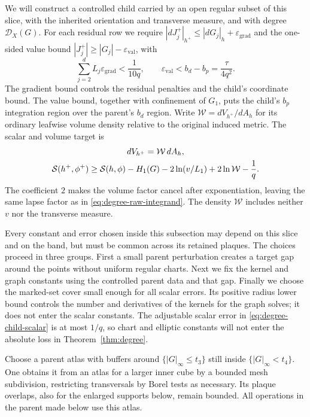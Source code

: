 We will construct a controlled child carried by an open regular subset
of this slice, with the inherited orientation and transverse measure,
and with degree $\mathcal D_X(G)$.  For each residual row we require
$|dJ_j^+|_{h^+}\le |dG_j|_h+\varepsilon_{\mathrm{grad}}$ and the
one-sided value bound
$|J_j^+|\ge |G_j|-\varepsilon_{\mathrm{val}}$, with
\begin{equation}\label{eq:degree-tolerances}
 \sum_{j=2}^d L_j\varepsilon_{\mathrm{grad}}<\frac1{10q},
 \qquad \varepsilon_{\mathrm{val}}<b_d-b_p=\frac{\tau}{4q^2}.
\end{equation}
The gradient bound controls the residual penalties and the child's
coordinate bound.
The value bound, together with confinement of $G_1$, puts the child's
$b_p$ integration region over the parent's $b_d$ region.  Write
$\mathcal W=dV_{h^+}/dA_h$ for its ordinary leafwise volume density
relative to the original induced metric.  The scalar and volume target is
\begin{equation}\label{eq:degree-child-scalar}
 \begin{gathered}
 dV_{h^+}=\mathcal W\,dA_h,\\
 \mathcal S(h^+,\phi^+)\ge\mathcal S(h,\phi)-H_1(G)-2\ln(v/L_1)
                                      +2\ln\mathcal W-\frac1q.
 \end{gathered}
\end{equation}
The coefficient $2$ makes the volume factor cancel after exponentiation,
leaving the same lapse factor as in \eqref{eq:degree-raw-integrand}.
The density $\mathcal W$ includes neither $v$ nor the transverse measure.

Every constant and error chosen inside this subsection may depend on this
slice and on the band, but must be common across its retained plaques.
The choices proceed in three groups.  First a small parent perturbation
creates a target gap around the points without uniform regular charts.
Next we fix the kernel and graph constants using the controlled parent
data and that gap.  Finally we choose the marked-set cover small enough
for all scalar errors.  Its positive radius lower bound controls the
number and derivatives of the kernels for the graph solves; it does not
enter the scalar constants.  The adjustable scalar error in
\eqref{eq:degree-child-scalar} is at most $1/q$, so chart and elliptic
constants will not enter the absolute loss in Theorem~\ref{thm:degree}.

Choose a parent atlas with buffers around $\{|G|_\infty\le t_3\}$ still
inside $\{|G|_\infty<t_4\}$.  One obtains it from an atlas for a larger
inner cube by a bounded mesh subdivision, restricting transversals by
Borel tests as necessary.  Its plaque overlaps, also for the enlarged
supports below, remain bounded.  All operations in the parent made below
use this atlas.

